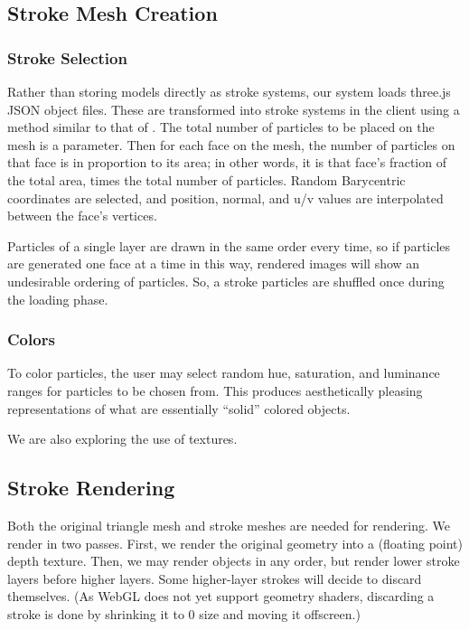 \documentclass[conference]{acmsiggraph}
\begin{document}
\subsection{Stroke Mesh Creation}

\subsubsection{Stroke Selection}

Rather than storing models directly as stroke systems, our system loads
three.js JSON object files. These are transformed into stroke systems in the
client using a method similar to that of \cite{Meier:1996:PRA:237170.237288}.
The total number of particles to be placed on the mesh is a parameter. Then for
each face on the mesh, the number of particles on that face is in proportion to
its area; in other words, it is that face's fraction of the total area, times
the total number of particles. Random Barycentric coordinates are selected, and
position, normal, and u/v values are interpolated between the face's vertices.

Particles of a single layer are drawn in the same order every time, so if
particles are generated one face at a time in this way, rendered images will
show an undesirable ordering of particles. So, a stroke particles are shuffled
once during the loading phase.


\subsubsection{Colors}

To color particles, the user may select random hue, saturation, and luminance
ranges for particles to be chosen from. This produces aesthetically pleasing
representations of what are essentially ``solid'' colored objects.

We are also exploring the use of textures.


\subsection{Stroke Rendering}

Both the original triangle mesh and stroke meshes are needed for rendering. We
render in two passes. First, we render the original geometry into a (floating
point) depth texture. Then, we may render objects in any order, but render
lower stroke layers before higher layers. Some higher-layer strokes will decide
to discard themselves. (As WebGL does not yet support geometry shaders,
discarding a stroke is done by shrinking it to 0 size and moving it offscreen.)
\end{document}
